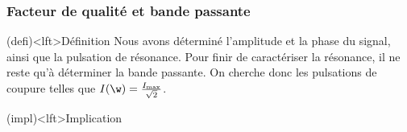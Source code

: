 \documentclass[../../main/main.tex]{subfiles}
\begin{document}
\subsubsection{Facteur de qualité et bande passante}
\begin{tcb}(defi)<lft>{Définition}
	Nous avons déterminé l'amplitude et la phase du signal, ainsi que la
	pulsation de résonance. Pour finir de caractériser la résonance, il ne reste
	qu'à déterminer la bande passante. On cherche donc les pulsations de coupure
	telles que $I(\w) = \frac{I_{\max}}{\sqrt{2}}$.
\end{tcb}
\begin{tcb}(impl)<lft>{Implication}
\end{tcb}
\end{document}
